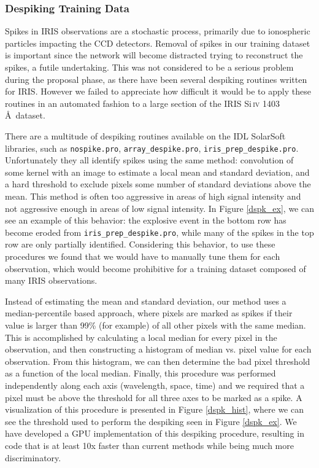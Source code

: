 \documentclass[10pt,letterpaper]{article}
\newcommand{\SiIV}{Si\,\textsc{iv} 1403 \AA}
\begin{document}
				
							
			\subsubsection{Despiking Training Data}	\label{sec_dspk}
			
				Spikes in IRIS observations are a stochastic process, primarily due to ionospheric particles impacting the CCD detectors.
				Removal of spikes in our training dataset is important since the network will become distracted trying to reconstruct the spikes, a futile undertaking.
				This was not considered to be a serious problem during the proposal phase, as there have been several despiking routines written for IRIS.
				However we failed to appreciate how difficult it would be to apply these routines in an automated fashion to a large section of the IRIS \SiIV\ dataset.
				
				There are a multitude of despiking routines available on the IDL SolarSoft libraries, such as \texttt{nospike.pro}, \texttt{array\_despike.pro}, \texttt{iris\_prep\_despike.pro}.
				Unfortunately they all identify spikes using the same method: convolution of some kernel with an image to estimate a local mean and standard deviation, and a hard threshold to exclude pixels some number of standard deviations above the mean.
				This method is often too aggressive in areas of high signal intensity and not aggressive enough in areas of low signal intensity.
				In Figure \ref{dspk_ex}, we can see an example of this behavior: the explosive event in the bottom row has become eroded from \texttt{iris\_prep\_despike.pro}, while many of the spikes in the top row are only partially identified.
				Considering this behavior, to use these procedures we found that we would have to manually tune them for each observation, which would become prohibitive for a training dataset composed of many IRIS observations.
				
				Instead of estimating the mean and standard deviation, our method uses a median-percentile based approach, where pixels are marked as spikes if their value is larger than 99\% (for example) of all other pixels with the same median. 
				This is accomplished by calculating a local median for every pixel in the observation, and then constructing a histogram of median vs. pixel value for each observation.
				From this histogram, we can then determine the bad pixel threshold as a function of the local median.
				Finally, this procedure was performed independently along each axis (wavelength, space, time) and we required that a pixel must be above the threshold for all three axes to be marked as a spike.
				A visualization of this procedure is presented in Figure \ref{dspk_hist}, where we can see the threshold used to perform the despiking seen in Figure \ref{dspk_ex}.		
				We have developed a GPU implementation of this despiking procedure, resulting in code that is at least 10x faster than current methods while being much more discriminatory.
				
\end{document}
